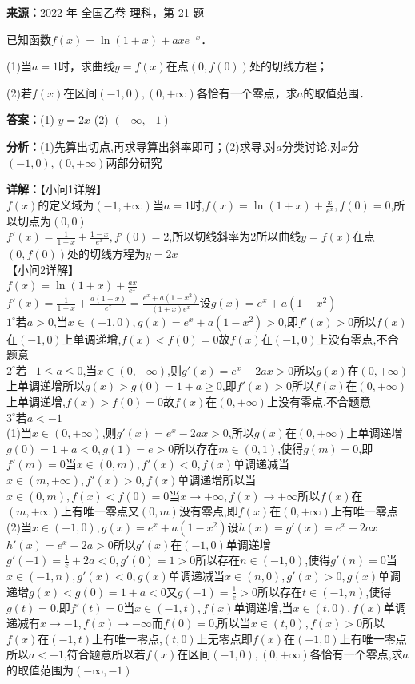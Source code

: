 \begin{question}[points=12]
\textbf{来源：}2022 年 全国乙卷-理科，第 21 题\par
已知函数$f(x)=\ln(1+x)+axe^{-x}$．

(1)当$a=1$时，求曲线$y=f(x)$在点$(0,f(0))$处的切线方程；

(2)若$f(x)$在区间$(-1,0),(0,+\infty)$各恰有一个零点，求$a$的取值范围．
\begin{solution}
\textbf{答案：}(1) $y=2x$
(2) $(-\infty,-1)$

\textbf{分析：}(1)先算出切点,再求导算出斜率即可；(2)求导,对$a$分类讨论,对$x$分$(-1,0),(0,+\infty)$两部分研究

\textbf{详解：}【小问1详解】\\$f(x)$的定义域为$(-1,+\infty)$当$a=1$时,$f(x)=\ln(1+x)+\frac{x}{e^x}, f(0)=0$,所以切点为$(0,0)$\\$f'(x)=\frac{1}{1+x}+\frac{1-x}{e^x}, f'(0)=2$,所以切线斜率为2所以曲线$y=f(x)$在点$(0,f(0))$处的切线方程为$y=2x$\\【小问2详解】\\$f(x)=\ln(1+x)+\frac{ax}{e^x}$\\$f'(x)=\frac{1}{1+x}+\frac{a(1-x)}{e^x}=\frac{e^x+a(1-x^2)}{(1+x)e^x}$设$g(x)=e^x+a(1-x^2)$\\$1^\circ$若$a>0$,当$x\in(-1,0), g(x)=e^x+a(1-x^2)>0$,即$f'(x)>0$所以$f(x)$在$(-1,0)$上单调递增,$f(x)<f(0)=0$故$f(x)$在$(-1,0)$上没有零点,不合题意\\$2^\circ$若$-1\leq a\leq 0$,当$x\in(0,+\infty)$,则$g'(x)=e^x-2ax>0$所以$g(x)$在$(0,+\infty)$上单调递增所以$g(x)>g(0)=1+a\geq0$,即$f'(x)>0$所以$f(x)$在$(0,+\infty)$上单调递增,$f(x)>f(0)=0$故$f(x)$在$(0,+\infty)$上没有零点,不合题意\\$3^\circ$若$a<-1$\\(1)当$x\in(0,+\infty)$,则$g'(x)=e^x-2ax>0$,所以$g(x)$在$(0,+\infty)$上单调递增\\$g(0)=1+a<0, g(1)=e>0$所以存在$m\in(0,1)$,使得$g(m)=0$,即$f'(m)=0$当$x\in(0,m), f'(x)<0, f(x)$单调递减当$x\in(m,+\infty), f'(x)>0, f(x)$单调递增所以当$x\in(0,m), f(x)<f(0)=0$当$x\to+\infty, f(x)\to+\infty$所以$f(x)$在$(m,+\infty)$上有唯一零点又$(0,m)$没有零点,即$f(x)$在$(0,+\infty)$上有唯一零点\\(2)当$x\in(-1,0), g(x)=e^x+a(1-x^2)$设$h(x)=g'(x)=e^x-2ax$\\$h'(x)=e^x-2a>0$所以$g'(x)$在$(-1,0)$单调递增\\$g'(-1)=\frac{1}{e}+2a<0, g'(0)=1>0$所以存在$n\in(-1,0)$,使得$g'(n)=0$当$x\in(-1,n), g'(x)<0, g(x)$单调递减当$x\in(n,0), g'(x)>0, g(x)$单调递增$g(x)<g(0)=1+a<0$又$g(-1)=\frac{1}{e}>0$所以存在$t\in(-1,n)$,使得$g(t)=0$,即$f'(t)=0$当$x\in(-1,t), f(x)$单调递增,当$x\in(t,0), f(x)$单调递减有$x\to-1, f(x)\to-\infty$而$f(0)=0$,所以当$x\in(t,0), f(x)>0$所以$f(x)$在$(-1,t)$上有唯一零点,$(t,0)$上无零点即$f(x)$在$(-1,0)$上有唯一零点所以$a<-1$,符合题意所以若$f(x)$在区间$(-1,0),(0,+\infty)$各恰有一个零点,求$a$的取值范围为$(-\infty,-1)$
\end{solution}
\end{question}

